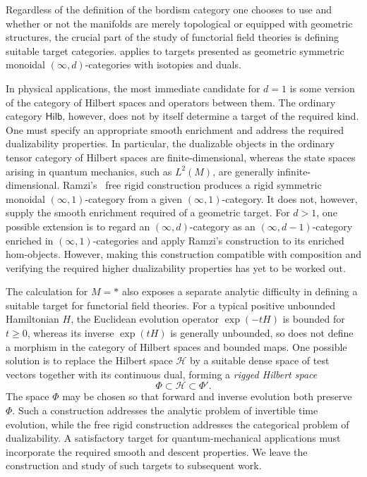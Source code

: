 \documentclass{amsart}
\newcommand{\cat}[1]{\mathsf{#1}}
\theoremstyle{definition}
\numberwithin{equation}{subsection}
\numberwithin{subsubsection}{subsection}
\begin{document}
Regardless of the definition of the bordism category one chooses to use and
whether or not the manifolds are merely topological or equipped with geometric
structures, the crucial part of the study of functorial field theories is
defining suitable target categories.  applies
to targets presented as geometric symmetric monoidal \((\infty,d)\)-categories
with isotopies and duals.

In physical applications, the most immediate candidate for $d=1$ is some version
of the category of Hilbert spaces and operators between them. The ordinary
category \(\cat{Hilb}\), however, does not by itself determine a target of the
required kind. One must specify an appropriate smooth enrichment and address the
required dualizability properties. In particular, the dualizable objects in the
ordinary tensor category of Hilbert spaces are finite-dimensional, whereas the
state spaces arising in quantum mechanics, such as \(L^2(M)\), are generally
infinite-dimensional. Ramzi's~\cite{Ram26} free rigid construction produces a
rigid symmetric monoidal \((\infty,1)\)-category from a given
\((\infty,1)\)-category. It does not, however, supply the smooth enrichment
required of a geometric target. For \(d>1\), one possible extension is to regard
an \((\infty,d)\)-category as an \((\infty,d-1)\)-category enriched in
\((\infty,1)\)-categories and apply Ramzi's construction to its enriched
hom-objects. However, making this construction compatible with composition and
verifying the required higher dualizability properties has yet to be worked out.

The calculation for \(M=*\) also exposes a separate analytic difficulty in
defining a suitable target for functorial field theories. For a typical positive
unbounded Hamiltonian \(H\), the Euclidean evolution operator \(\exp(-tH)\) is
bounded for \(t\geq 0\), whereas its inverse \(\exp(tH)\) is generally
unbounded, so does not define a morphism in the category of Hilbert spaces and
bounded maps. One possible solution is to replace the Hilbert space
\(\mathcal{H}\) by a suitable dense space of test vectors together with its
continuous dual, forming a
\emph{rigged Hilbert space}
\[
  \Phi\subset\mathcal{H}\subset\Phi'.
\]
The space \(\Phi\) may be chosen so that forward and inverse evolution
both preserve \(\Phi\).
Such a construction addresses the analytic problem of invertible
time evolution, while the free rigid construction addresses the categorical
problem of dualizability. A satisfactory target for quantum-mechanical
applications must incorporate the required smooth and descent properties.
We leave the construction and study of such targets to subsequent work.
\end{document}
